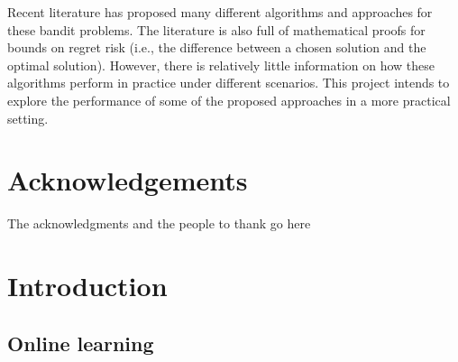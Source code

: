 Recent literature has proposed many different algorithms and approaches for these bandit problems. The literature is also full of mathematical proofs for bounds on regret risk (i.e., the difference between a chosen solution and the optimal solution). However, there is relatively little information on how these algorithms perform in practice under different scenarios. This project intends to explore the performance of some of the proposed approaches in a more practical setting.

\pagebreak

\vfill %


\section{Acknowledgements}
The acknowledgments and the people to thank go here

\pagebreak


\tableofcontents %
\listoffigures
\listoftables

\pagebreak


\section{Introduction}

\subsection{Online learning}

